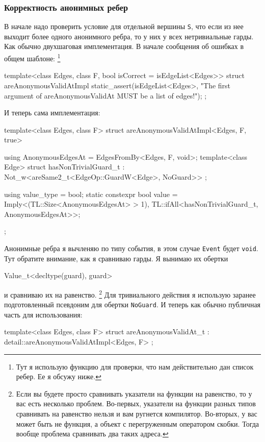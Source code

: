 \documentclass{article}
\begin{document}
{\subsubsection{Корректность анонимных ребер}

В начале надо проверить условие для отдельной вершины \verb"S", что если из нее выходит более одного анонимного ребра, то у них у всех нетривиальные гарды.
Как обычно двухшаговая имплементация.
В начале сообщения об ошибках в общем шаблоне:%
\footnote{Тут я использую функцию для проверки, что нам действительно дан список ребер.
Ее я обсужу ниже.}
\begin{cppcode}[\nonumbers]
template<class Edges, class F, bool isCorrect = isEdgeList<Edges>>
struct areAnonymousValidAtImpl {
  static_assert(isEdgeList<Edges>,
                "The first argument of areAnonymousValidAt MUST be a list of edges!");
};
\end{cppcode}
И теперь сама имплементация:
\begin{cppcode}[\nonumbers]
template<class Edges, class F>
struct areAnonymousValidAtImpl<Edges, F, true> {
  using AnonymousEdgesAt = EdgesFromBy<Edges, F, void>;
  template<class Edge>
  struct hasNonTrivialGuard_t : Not_w<areSame2_t<EdgeOp::GuardW<Edge>, NoGuard>> {};
  
  using value_type = bool;
  static constexpr bool value =
      Imply<(TL::Size<AnonymousEdgesAt> > 1), TL::ifAll<hasNonTrivialGuard_t, AnonymousEdgesAt>>;
};
\end{cppcode}
Анонимные ребра я вычленяю по типу события, в этом случае \verb"Event" будет \verb"void".
Тут обратите внимание, как я сравниваю гарды.
Я вынимаю их обертки
\begin{cppcode}[\nonumbers]
Value_t<decltype(guard), guard>
\end{cppcode}
и сравниваю их на равенство.%
\footnote{Если вы будете просто сравнивать указатели на функции на равенство, то у вас есть несколько проблем.
Во-первых, указатели на функции разных типов сравнивать на равенство нельзя и вам ругнется компилятор.
Во-вторых, у вас может быть не функция, а объект с перегруженным оператором скобки.
Тогда вообще проблема сравнивать два таких адреса.}
Для тривиального действия я использую заранее подготовленный псевдоним для обертки \verb"NoGuard".
И теперь как обычно публичная часть для использования:
\begin{cppcode}[\nonumbers]
template<class Edges, class F>
struct areAnonymousValidAt_t : detail::areAnonymousValidAtImpl<Edges, F> {};


\end{cppcode}}
\end{document}
